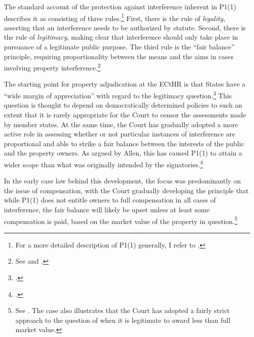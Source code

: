 The standard account of the protection against interference inherent in P1(1) describes it as consisting of three rules.\footnote{For a more detailed description of P1(1) generally, I refer to \cite{allen05}.} First, there is the rule of {\it legality}, asserting that an interference needs to be authorized by statute. Second, there is the rule of {\it legitimacy}, making clear that interference should only take place in pursuance of a legitimate public purpose. The third rule is the ``fair balance'' principle, requiring proportionality between the means and the aims in cases involving property interference.\footnote{See \cite[69]{sporrong82} and \cite[120]{james86}.} %

The starting point for property adjudication at the ECtHR is that States have a ``wide margin of appreciation'' with regard to the legitimacy question.\footcite[See][54]{james86} This question is thought to depend on democratically determined policies to such an extent that it is rarely appropriate for the Court to censor the assessments made by member states. At the same time, the Court has gradually adopted a more active role in assessing whether or not particular instances of interference are proportional and able to strike a fair balance between the interests of the public and the property owners. As argued by Allen, this has caused P1(1) to attain a wider scope than what was originally intended by the signatories.\footcite[1055]{allen10}

In the early case law behind this development, the focus was predominantly on the issue of compensation, with the Court gradually developing the principle that while P1(1) does not entitle owners to full compensation in all cases of interference, the fair balance will likely be upset unless at least some compensation is paid, based on the market value of the property in question.\footnote{See \cite[103]{scordino06}. The case also illustrates that the Court has adopted a fairly strict approach to the question of when it is legitimate to award less than full market value.} %

